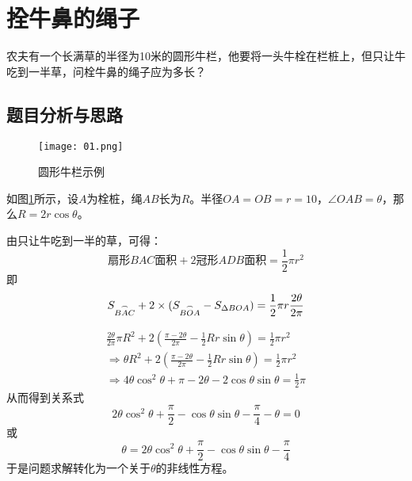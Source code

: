 \documentclass{math201}
\date{\today}
\begin{document}
\makecover


\section{拴牛鼻的绳子}
农夫有一个长满草的半径为10米的圆形牛栏，他要将一头牛栓在栏桩上，但只让牛吃到一半草，问栓牛鼻的绳子应为多长？

\subsection{题目分析与思路}

\begin{figure}[H]  
    \centering\texttt{[image: 01.png]}  
    \caption{圆形牛栏示例}     
    \label{img01}   
\end{figure}
    
如图\ref*{img01}所示，设$A$为栓桩，绳$AB$长为$R$。半径$OA=OB=r=10$，$\angle OAB=\theta$，那么$R=2r\cos\theta$。

由只让牛吃到一半的草，可得：
\begin{equation}
    \mbox{扇形}BAC\mbox{面积} + 2\mbox{冠形}ADB\mbox{面积} = \frac{1}{2}\pi r^2
\end{equation}
即
\begin{equation}
    S_{\overset{\frown}{BAC}} + 2\times(S_{\overset{\frown}{BOA}} - S_{\Delta BOA}) = \frac{1}{2}\pi r \\
    \frac{2\theta}{2\pi}
    \nonumber
\end{equation}

\begin{equation}
    \begin{split}
        \frac{2\theta}{2\pi}\pi R^2 + 2(\frac{\pi - 2\theta}{2\pi} - \frac{1}{2}Rr\sin\theta) = \frac{1}{2}\pi r^2 \\
        \Rightarrow \theta R^2 + 2(\frac{\pi - 2\theta}{2\pi} - \frac{1}{2}Rr\sin\theta) = \frac{1}{2}\pi r^2 \\
        \Rightarrow 4\theta\cos^2\theta + \pi - 2\theta - 2\cos\theta\sin\theta = \frac{1}{2}\pi
    \end{split}
    \nonumber
\end{equation}
从而得到关系式
\begin{equation}
    2\theta\cos^2\theta + \frac{\pi}{2} - \cos\theta\sin\theta - \frac{\pi}{4} - \theta = 0 \label{equation:1}
\end{equation}
或
\begin{equation}
    \theta = 2\theta\cos^2\theta + \frac{\pi}{2} - \cos\theta\sin\theta - \frac{\pi}{4}
\end{equation}
于是问题求解转化为一个关于$\theta$的非线性方程。
\end{document}
